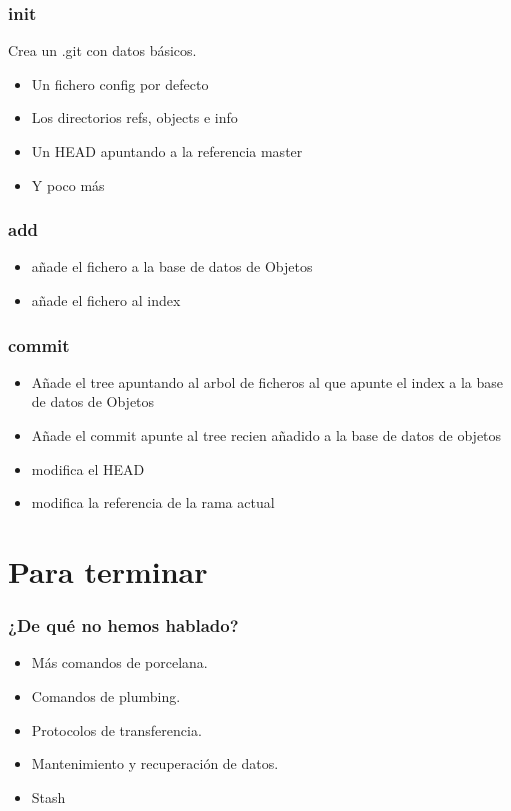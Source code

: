 \documentclass[10pt]{beamer}
\begin{document}
  \begin{frame}
    \frametitle{init}
    Crea un .git con datos básicos.
    \begin{itemize}
      \item Un fichero config por defecto
      \item Los directorios refs, objects e info
      \item Un HEAD apuntando a la referencia master
      \item Y poco más
    \end{itemize}
  \end{frame}

  \begin{frame}
    \frametitle{add}
    \begin{itemize}
      \item añade el fichero a la base de datos de Objetos
      \item añade el fichero al index
    \end{itemize}
  \end{frame}

  \begin{frame}
    \frametitle{commit}
    \begin{itemize}
      \item Añade el tree apuntando al arbol de ficheros al que apunte el index a la base de datos de Objetos
      \item Añade el commit apunte al tree recien añadido a la base de datos de objetos
      \item modifica el HEAD
      \item modifica la referencia de la rama actual
    \end{itemize}
  \end{frame}

  \section*{Para terminar}

  \begin{frame}
    \frametitle{¿De qué no hemos hablado?}
    \begin{itemize}
        \item Más comandos de porcelana.
        \item Comandos de plumbing.
        \item Protocolos de transferencia.
        \item Mantenimiento y recuperación de datos.
        \item Stash
    \end{itemize}
  \end{frame}
\end{document}
